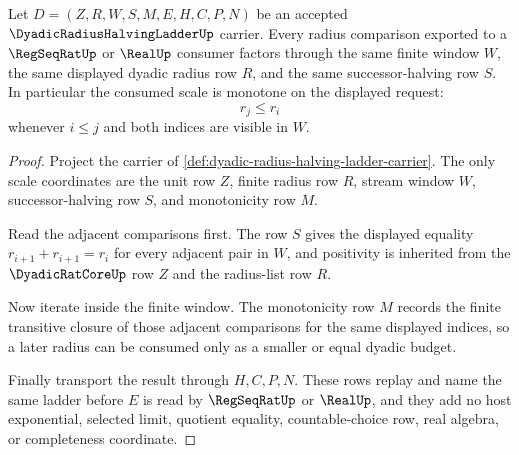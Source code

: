 \begin{theorem}
\label{thm:dyadic-radius-halving-ladder-monotone-scale}
Let $D=(Z,R,W,S,M,E,H,C,P,N)$ be an accepted $\DyadicRadiusHalvingLadderUp$ carrier. Every radius comparison exported to a $\RegSeqRatUp$ or $\RealUp$ consumer factors through the same finite window $W$, the same displayed dyadic radius row $R$, and the same successor-halving row $S$. In particular the consumed scale is monotone on the displayed request:
$$
r_{j}\le r_i
$$
whenever $i\le j$ and both indices are visible in $W$.
\end{theorem}
\begin{proof}
Project the carrier of \autoref{def:dyadic-radius-halving-ladder-carrier}. The only scale coordinates are the unit row $Z$, finite radius row $R$, stream window $W$, successor-halving row $S$, and monotonicity row $M$.

Read the adjacent comparisons first. The row $S$ gives the displayed equality $r_{i+1}+r_{i+1}=r_i$ for every adjacent pair in $W$, and positivity is inherited from the $\DyadicRatCoreUp$ row $Z$ and the radius-list row $R$.

Now iterate inside the finite window. The monotonicity row $M$ records the finite transitive closure of those adjacent comparisons for the same displayed indices, so a later radius can be consumed only as a smaller or equal dyadic budget.

Finally transport the result through $H,C,P,N$. These rows replay and name the same ladder before $E$ is read by $\RegSeqRatUp$ or $\RealUp$, and they add no host exponential, selected limit, quotient equality, countable-choice row, real algebra, or completeness coordinate.
\end{proof}

